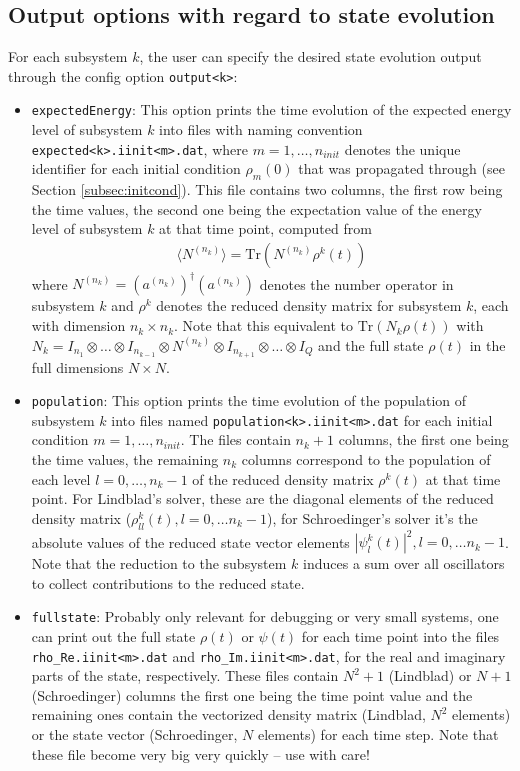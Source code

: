 \documentclass[11pt]{article}
\begin{document}
\subsection{Output options with regard to state evolution}
For each subsystem $k$, the user can specify the desired state evolution output through the config option \texttt{output<k>}:
\begin{itemize}
  \item \texttt{expectedEnergy}: This option prints the time evolution of the expected energy level of subsystem $k$ into files with naming convention \texttt{expected<k>.iinit<m>.dat}, where $m=1,\dots,n_{init}$ denotes the unique identifier for each initial condition $\rho_m(0)$ that was propagated through (see Section \ref{subsec:initcond}). This file contains two columns, the first row being the time values, the second one being the expectation value of the energy level of subsystem $k$ at that time point, computed from 
  \begin{align}
    \langle N^{(n_k)}\rangle = \mbox{Tr}\left(N^{(n_k)} \rho^k(t)\right)
  \end{align}
  where $N^{(n_k)} = \left(a^{(n_k)}\right)^\dagger \left(a^{(n_k)}\right)$ denotes the number operator in subsystem $k$ and $\rho^k$ denotes the reduced density matrix for subsystem $k$, each with dimension $n_k\times n_k$. Note that this equivalent to $\mbox{Tr}\left(N_k \rho(t)\right)$ with $N_k = I_{n_1} \otimes \dots \otimes I_{n_{k-1}} \otimes N^{(n_k)} \otimes I_{n_{k+1}}\otimes \dots \otimes I_Q$ and the full state $\rho(t)$ in the full dimensions $N\times N$.
  \item \texttt{population}: This option prints the time evolution of the population of subsystem $k$ into files named \texttt{population<k>.iinit<m>.dat} for each initial condition $m=1,\dots, n_{init}$. The files contain $n_k+1$ columns, the first one being the time values, the remaining $n_k$ columns correspond to the population of each level $l=0,\dots,n_k-1$ of the reduced density matrix $\rho^k(t)$ at that time point. For Lindblad's solver, these are the diagonal elements of the reduced density matrix ($\rho_{ll}^k(t), l=0,\dots n_k-1$), for Schroedinger's solver it's the absolute values of the reduced state vector elements $|\psi^k_l(t)|^2, l=0,\dots n_k-1$. Note that the reduction to the subsystem $k$ induces a sum over all oscillators to collect contributions to the reduced state. 
  \item \texttt{fullstate}: Probably only relevant for debugging or very small systems, one can print out the full state $\rho(t)$ or $\psi(t)$ for each time point into the files \texttt{rho\_Re.iinit<m>.dat} and \texttt{rho\_Im.iinit<m>.dat}, for the real and imaginary parts of the state, respectively. These files contain $N^2 +1$ (Lindblad) or $N+1$ (Schroedinger) columns the first one being the time point value and the remaining ones contain the vectorized density matrix (Lindblad, $N^2$ elements) or the state vector (Schroedinger, $N$ elements) for each time step. Note that these file become very big very quickly -- use with care!
\end{itemize}
\end{document}
